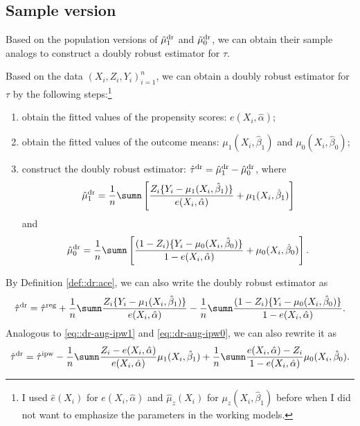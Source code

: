  

\subsection{Sample version}


Based on the population versions of $\tilde{\mu}_1^\textup{dr} $ and $\tilde{\mu}_0^\textup{dr} $, we can obtain their sample analogs to construct a doubly robust estimator for $\tau$.


\begin{definition}
\label{def::dr:ace}
Based on the data $(X_i, Z_i, Y_i)_{i=1}^n$, we can obtain a doubly robust estimator for $\tau$ by the following steps:\footnote{I used $\hat e(X_i)$ for $e(X_i, \hat{\alpha})$ and $ \hat \mu_z(X_i) $ for $ \mu_z(X_i, \hat{\beta}_1) $ before when I did not want to emphasize the parameters in the working models.} 
\begin{enumerate}
[(1)]
\item
obtain the fitted values of the propensity scores: $e(X_i, \hat{\alpha})$; 
\item
obtain the fitted values of the outcome means: $ \mu_1(X_i, \hat{\beta}_1) $ and $ \mu_0(X_i, \hat{\beta}_0) $; 
\item
construct the doubly robust estimator: $\hat{\tau}^\textup{dr} = \hat{\mu}_1^\textup{dr}  - \hat{\mu}_0^\textup{dr}$, where
$$
 \hat{\mu}_1^\textup{dr}  = \frac{1}{n} \sumn \left[ \frac{Z_i\{ Y_i-\mu_1(X_i,\hat{\beta}_1) \}}{  e(X_i, \hat{\alpha}) }   + \mu_1(X_i, \hat{\beta}_1) \right]
$$
and
$$
 \hat{\mu}_0^\textup{dr}  = \frac{1}{n} \sumn \left[  \frac{(1-Z_i)\{ Y_i-\mu_0(X_i, \hat{\beta}_0) \}}{  1-e(X_i,\hat{\alpha}) }   + \mu_0(X_i, \hat{\beta}_0)       \right] . 
$$
\end{enumerate}
\end{definition}

By Definition \ref{def::dr:ace}, we can also write the doubly robust estimator as
$$
\hat{\tau}^\textup{dr} =\hat{\tau}^\textup{reg}  + 
\frac{1}{n} \sumn  \frac{Z_i\{ Y_i-\mu_1(X_i,\hat{\beta}_1) \}}{  e(X_i, \hat{\alpha}) } 
-  \frac{1}{n} \sumn   \frac{(1-Z_i)\{ Y_i-\mu_0(X_i, \hat{\beta}_0) \}}{  1-e(X_i,\hat{\alpha}) }  . 
$$ 
Analogous to \eqref{eq::dr-aug-ipw1} and \eqref{eq::dr-aug-ipw0}, we can also rewrite it as 
$$
\hat{\tau}^\textup{dr} = \hat{\tau}^\textup{ipw}  
  - \frac{1}{n} \sumn    \frac{  Z_i -  e(X_i, \hat\alpha)  }{ e(X_i, \hat\alpha) } \mu_1(X_i, \hat\beta_1)
  + \frac{1}{n} \sumn    \frac{ e(X_i, \hat\alpha)-Z_i  }{1- e(X_i,\hat \alpha)} \mu_0(X_i, \hat\beta_0) .
$$ 

